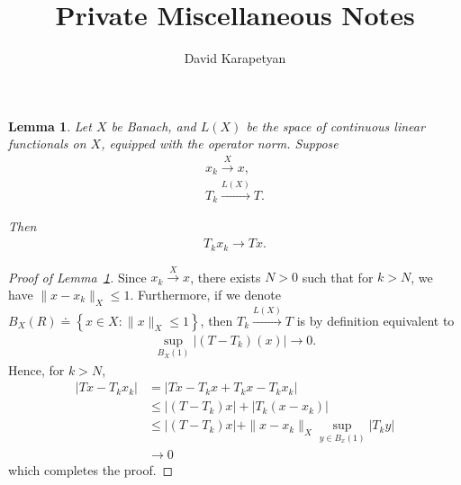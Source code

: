 \documentclass[12pt,reqno]{amsart}
\numberwithin{equation}{section}  %
\newtheorem{lemma}[theorem]{Lemma}
\begin{document}
\title{Private Miscellaneous Notes}
\author{David Karapetyan}
        \maketitle
        \section{}
        \label{sec:ll}

\begin{lemma}
Let $X$ be Banach, and $L(X)$ be the space of continuous linear functionals on
$X$, equipped with the operator norm. Suppose
%
%
\begin{gather*}
  x_{k} \xrightarrow{X} x,
  \\
  T_{k} \xrightarrow{L(X)} T.
\end{gather*}

%
%
Then
\begin{gather*}
  T_{k} x_{k} \to Tx.
\end{gather*}
%
\label{lem:diag}
\end{lemma}
%
%
\begin{proof}[Proof of Lemma~\ref{lem:diag}]
  Since $x_{k} \xrightarrow{X} x$, there exists $N > 0$ such that for $k > N$,
  we have $\|x -x_{k} \|_{X} \le 1$. Furthermore, if we denote $B_{X}(R) \doteq
  \left\{ x \in X: \| x \|_{X} \le 1 \right\}$, then $T_{k}
  \xrightarrow{L(X)} T$ is by definition equivalent to
  \begin{equation*}
  \begin{split}
    \sup_{B_{X}(1)}  | (T - T_{k})(x) | \to 0.
  \end{split}
  \end{equation*}
  Hence, for $k > N$,
  \begin{equation*}
  \begin{split}
    | Tx - T_{k}x_{k} |
    & = | Tx - T_{k}x + T_{k}x - T_{k}x_{k} |
    \\
    & \le | (T - T_{k})x | + | T_{k}(x -x_{k}) |
    \\
    & \le | (T - T_{k})x |
    + \| x - x_{k}\|_{X} \sup_{y \in B_{x}(1)} | T_{k}y |
    \\
    & \to 0
  \end{split}
  \end{equation*}
  which completes the proof.
\end{proof}
\end{document}
